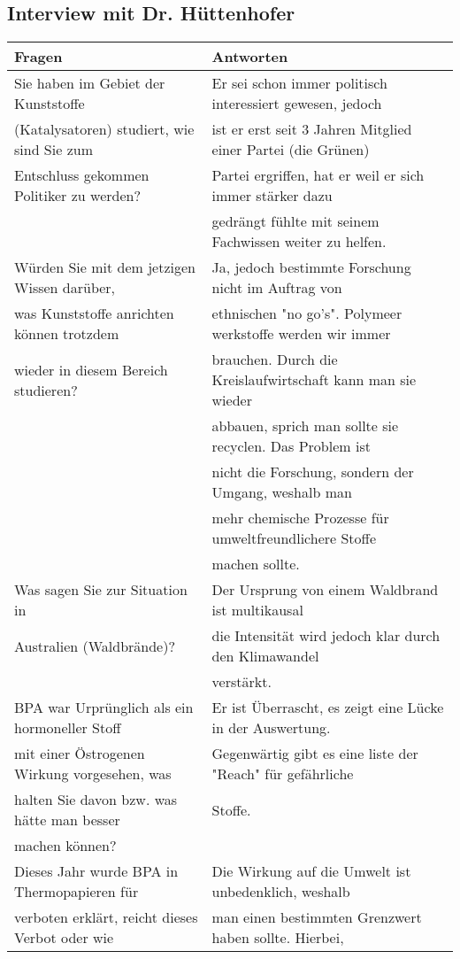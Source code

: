 \subsection{Interview mit Dr. Hüttenhofer}
\begin{tabular} [h]{l|l}
Fragen & Antworten\\
\hline
Sie haben im Gebiet der Kunststoffe &Er sei schon immer politisch interessiert gewesen, jedoch\\
(Katalysatoren) studiert, wie sind Sie zum& ist er erst seit 3 Jahren Mitglied einer Partei (die Grünen)\\
Entschluss gekommen Politiker zu werden? & Partei ergriffen, hat er weil er sich immer stärker dazu\\
& gedrängt fühlte mit seinem Fachwissen weiter zu helfen.\\
\hline
Würden Sie mit dem jetzigen Wissen darüber, & Ja, jedoch bestimmte Forschung nicht im Auftrag von\\
was Kunststoffe anrichten können trotzdem &ethnischen "no go's". Polymeer werkstoffe werden wir immer\\
wieder in diesem Bereich studieren? &brauchen. Durch die Kreislaufwirtschaft kann man sie wieder\\
&abbauen, sprich man sollte sie recyclen. Das Problem ist\\
&nicht die Forschung, sondern der Umgang, weshalb man\\
&mehr chemische Prozesse für umweltfreundlichere Stoffe\\
& machen sollte.\\
\hline
Was sagen Sie zur Situation in & Der Ursprung von einem Waldbrand ist multikausal\\
Australien (Waldbrände)?&die Intensität wird jedoch klar durch den Klimawandel\\
&verstärkt.\\
\hline
BPA war Urprünglich als ein hormoneller Stoff&Er ist Überrascht, es zeigt eine Lücke in der Auswertung.\\
mit einer Östrogenen Wirkung vorgesehen, was &Gegenwärtig gibt es eine liste der "Reach" für gefährliche \\
halten Sie davon bzw. was hätte man besser&Stoffe.\\
machen können?&\\
\hline
Dieses Jahr wurde BPA in Thermopapieren für & Die Wirkung auf die Umwelt ist unbedenklich, weshalb\\
verboten erklärt, reicht dieses Verbot oder wie &man einen bestimmten Grenzwert haben sollte. Hierbei,\\

\end{tabular}
